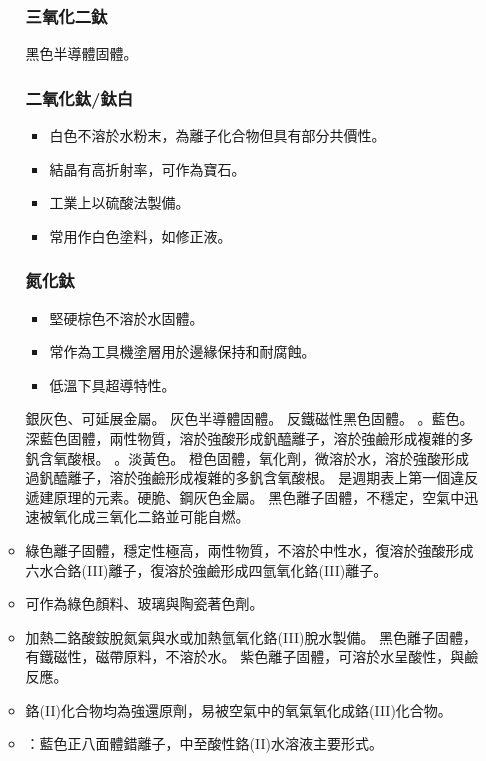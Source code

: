 \documentclass[a4paper,12pt]{report}
\begin{document}
\begin{itemize}
\begin{itemize}
\subsubsection{三氧化二鈦}
黑色半導體固體。
\subsubsection{二氧化鈦/鈦白}
\begin{itemize}
\item 白色不溶於水粉末，為離子化合物但具有部分共價性。
\item 結晶有高折射率，可作為寶石。
\item 工業上以硫酸法製備。
\item 常用作白色塗料，如修正液。
\end{itemize}
\subsubsection{氮化鈦}
\begin{itemize}
\item 堅硬棕色不溶於水固體。
\item 常作為工具機塗層用於邊緣保持和耐腐蝕。
\item 低溫下具超導特性。
\end{itemize}
銀灰色、可延展金屬。
灰色半導體固體。
反鐵磁性黑色固體。
。藍色。
深藍色固體，兩性物質，溶於強酸形成釩醯離子，溶於強鹼形成複雜的多釩含氧酸根。
。淡黃色。
橙色固體，氧化劑，微溶於水，溶於強酸形成過釩醯離子，溶於強鹼形成複雜的多釩含氧酸根。
是週期表上第一個違反遞建原理的元素。硬脆、鋼灰色金屬。
黑色離子固體，不穩定，空氣中迅速被氧化成三氧化二鉻並可能自燃。
\bit
\item 綠色離子固體，穩定性極高，兩性物質，不溶於中性水，復溶於強酸形成六水合鉻(III)離子，復溶於強鹼形成四氫氧化鉻(III)離子。
\item 可作為綠色顏料、玻璃與陶瓷著色劑。
\item 加熱二鉻酸銨脫氮氣與水或加熱氫氧化鉻(III)脫水製備。
\eit
{}
黑色離子固體，有鐵磁性，磁帶原料，不溶於水。
紫色離子固體，可溶於水呈酸性，與鹼反應。
\bit
\item 鉻(II)化合物均為強還原劑，易被空氣中的氧氣氧化成鉻(III)化合物。
\item {}：藍色正八面體錯離子，中至酸性鉻(II)水溶液主要形式。

\end{itemize}
\end{itemize}
\end{document}
